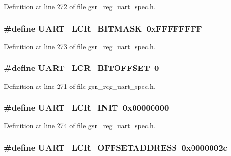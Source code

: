 Definition at line 272 of file gsn\_\-reg\_\-uart\_\-spec.h.

\hypertarget{a00575_a28e31fe85eeeb124ff6a471978155356}{
\subsubsection[{UART\_\-LCR\_\-BITMASK}]{\setlength{\rightskip}{0pt plus 5cm}\#define UART\_\-LCR\_\-BITMASK~0xFFFFFFFF}}
\label{a00575_a28e31fe85eeeb124ff6a471978155356}


Definition at line 273 of file gsn\_\-reg\_\-uart\_\-spec.h.

\hypertarget{a00575_a0d1d3e3a08b9268e877ad2081917ec42}{
\subsubsection[{UART\_\-LCR\_\-BITOFFSET}]{\setlength{\rightskip}{0pt plus 5cm}\#define UART\_\-LCR\_\-BITOFFSET~0}}
\label{a00575_a0d1d3e3a08b9268e877ad2081917ec42}


Definition at line 271 of file gsn\_\-reg\_\-uart\_\-spec.h.

\hypertarget{a00575_ab6fe7ce8caa8f59cb608e2c8316a3cf8}{
\subsubsection[{UART\_\-LCR\_\-INIT}]{\setlength{\rightskip}{0pt plus 5cm}\#define UART\_\-LCR\_\-INIT~0x00000000}}
\label{a00575_ab6fe7ce8caa8f59cb608e2c8316a3cf8}


Definition at line 274 of file gsn\_\-reg\_\-uart\_\-spec.h.

\hypertarget{a00575_a95ecbfebf796859e00c3f4b7f107fb5a}{
\subsubsection[{UART\_\-LCR\_\-OFFSETADDRESS}]{\setlength{\rightskip}{0pt plus 5cm}\#define UART\_\-LCR\_\-OFFSETADDRESS~0x0000002c}}
\label{a00575_a95ecbfebf796859e00c3f4b7f107fb5a}


